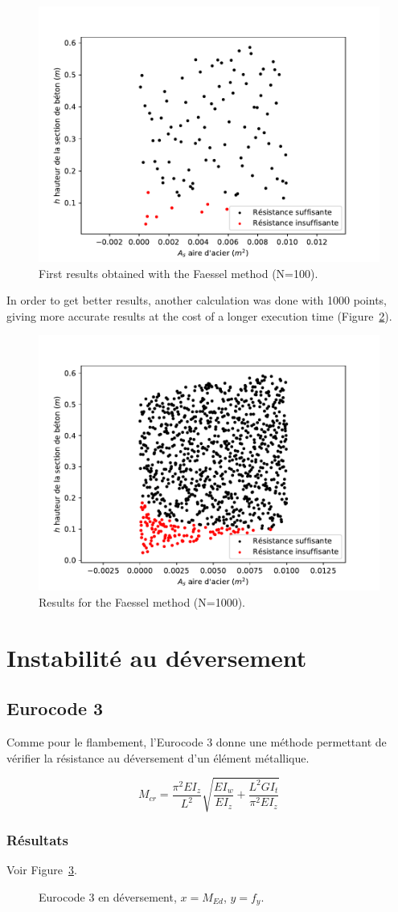 \documentclass{report}
\begin{document}
\begin{figure}[t]
  \centering
  \includegraphics[width=.6\linewidth]{fig/faessel2}
  \caption{First results obtained with the Faessel method (N=100).}\label{fig:faessel2}
\end{figure}

In order to get better results, another calculation was done with \num{1000} points, giving more accurate results at the cost of a longer execution time (Figure~\ref{fig:faessel3}).

\begin{figure}[t]
  \centering
  \includegraphics[width=.6\linewidth]{fig/faessel3}
  \caption{Results for the Faessel method (N=1000).}\label{fig:faessel3}
\end{figure}

\section{Instabilité au déversement}
\subsection{Eurocode 3}
Comme pour le flambement, l'Eurocode 3 donne une méthode permettant de vérifier la résistance au déversement d'un élément métallique.

\begin{dmath}
    M_{cr}=\frac{\pi^2 EI_z}{L^2}\sqrt{\frac{EI_w}{EI_z}+\frac{L^2GI_t}{\pi^2EI_z}}
\end{dmath}

\subsubsection{Résultats}
Voir Figure~\ref{fig:m1}.

\begin{figure}[!ht]
    \centering
    
    \caption{Eurocode 3 en déversement, $x=M_{Ed}$, $y=f_y$.}\label{fig:m1}
\end{figure}

\listoffigures

\nocite{*}
\printbibliography
\end{document}
